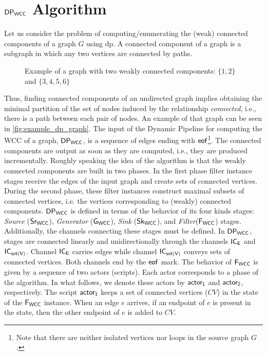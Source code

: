 \section{$\mathsf{DP_{WCC}}$ Algorithm}
Let us consider the problem of computing/enumerating the (weak) connected components of a graph $G$ using \acrshort{dp}. 
A connected component of a graph is a subgraph in which any two vertices are connected by paths. 
\begin{wrapfigure}{r}{0.4\textwidth}
  \begin{center}
\end{center}
\caption[Graph WCC Example]{Example of a graph with two weakly connected components: $\{1,2\}$ and $\{3,4,5,6\}$}
\label{fig:example_dp_graph}
\end{wrapfigure}
Thus, finding connected components of an undirected graph implies obtaining the minimal partition of the set of nodes induced by the relationship \textit{connected}, i.e., there is a path between each pair of nodes. An example of that graph can be seen in \autoref{fig:example_dp_graph}.
The input of the Dynamic Pipeline for computing the WCC of a graph, $\mathsf{DP_{WCC}}$, is a sequence of edges ending with $\mathsf{eof}$\footnote{Note that there are neither isolated vertices nor loops in the source graph $G$.}. The connected components are output as soon as they are computed, i.e., they are produced incrementally. 
Roughly speaking the idea of the algorithm is that the weakly connected components are built in two phases. In the first phase filter instance stages receive the edges of the input graph and create sets of connected vertices. 
During the second phase, these filter instances construct maximal subsets of connected vertices, i.e. the vertices corresponding to (weakly) connected components.
%
$\mathsf{DP_{WCC}}$ is defined in terms of the behavior of its four kinds stages: \textit{Source} ($\mathsf{Sr_{WCC}}$),  \textit{Generator} ($\mathsf{G_{WCC}}$),  \textit{Sink} ($\mathsf{Sk_{WCC}}$), and \textit{Filter}($\mathsf{F_{WCC}}$) stages. Additionally,  the channels connecting these stages must be defined. 
In $\mathsf{DP_{WCC}}$, stages are connected linearly and unidirectionally through the channels $\mathsf{IC_E}$ and  $\mathsf{IC_{set(V)}}$. Channel $\mathsf{IC_E}$ carries edges while channel  $\mathsf{IC_{set(V)}}$ conveys sets of connected vertices. Both channels end by the $\mathsf{eof}$ mark. 
The behavior of $\mathsf{F_{WCC}}$ is given by a sequence of two actors (scripts). Each actor corresponds to a phase of the algorithm. In what follows, we denote these actors by $\mathsf{actor_1}$ and $\mathsf{actor_2}$, respectively. 
The script $\mathsf{actor_1}$ keeps a set of connected vertices ($CV$) in the state of the $\mathsf{F_{WCC}}$ instance. When an edge $e$ arrives, if an endpoint of $e$ is present in the state, then the other endpoint of $e$ is added to $CV$. 
